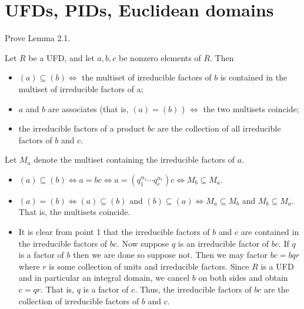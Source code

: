 \documentclass[../../master.tex]{subfiles}
\begin{document}
\section{UFDs, PIDs, Euclidean domains}
    
    \begin{problem}
        Prove Lemma 2.1.
        \begin{proposition}[Lemma 2.1]
            Let $R$ be a UFD, and let $a, b, c$ be nonzero elements of $R$. Then
            \begin{itemize}
                \item $(a) \subseteq (b) \Longleftrightarrow$ the multiset of
                    irreducible factors of $b$ is contained in the multiset of
                    irreducible factors of a;
                \item $a$ and $b$ are associates (that is, $(a) = (b)$ )
                    $\Longleftrightarrow$ the two multisets coincide;
                \item the irreducible factors of a product $bc$ are the
                    collection of all irreducible factors of $b$ and $c$.
            \end{itemize}
        \end{proposition}
    \end{problem}
    
    \begin{solution}
        Let $M_{a}$ denote the multiset containing the irreducible factors of
        $a$.
        \begin{itemize}
            \item $(a) \subseteq (b) \Longleftrightarrow a = bc
                \Longleftrightarrow a = (q_1^{\alpha_1} \cdots q_r^{\alpha_r}) c
                \Longleftrightarrow M_b \subseteq M_a$.

            \item $(a) = (b) \Longleftrightarrow (a) \subseteq (b)$ and $(b)
                \subseteq (a) \Longleftrightarrow M_a \subseteq M_b$ and $M_b
                \subseteq M_a$. That is, the multisets coincide.

            \item It is clear from point 1 that the irreducible factors of $b$
              and $c$ are contained in the irreducible factors of $bc$. Now
              suppose $q$ is an irreducible factor of $bc$. If $q$ is a
              factor of $b$ then we are done so suppose not. Then we may
              factor $bc = b q r$ where $r$ is some collection of units and
              irreducible factors. Since $R$ is a UFD and in particular an
              integral domain, we cancel $b$ on both sides and obtain $c =
              qr$. That is, $q$ is a factor of $c$. Thus, the irreducible
              factors of $bc$ are the collection of irreducible factors of $b$
              and $c$.
        \end{itemize}
    \end{solution}
\end{document}
